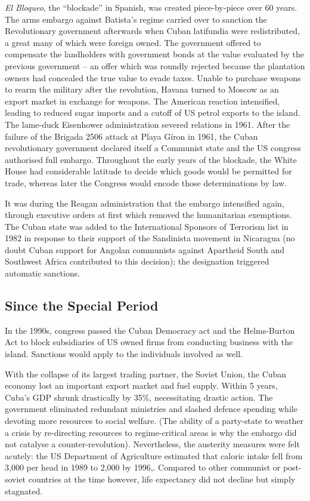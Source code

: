 \documentclass[letterpaper,12pt,twoside]{article} %
\begin{document}
\begin{multicols}{2}
\textit{El Bloqueo}, the ``blockade'' in Spanish, was created piece-by-piece over 60 years. The arms embargo against Batista's regime carried over to sanction the Revolutionary government afterwards when Cuban latifundia were redistributed, a great many of which were foreign owned. The government offered to compensate the landholders with government bonds at the value evaluated by the previous government \autocite[Chapter 7.]{von2011red} -- an offer which was roundly rejected because the plantation owners had concealed the true value to evade taxes. Unable to purchase weapons to rearm the military after the revolution, Havana turned to Moscow as an export market in exchange for weapons. The American reaction intensified, leading to reduced sugar imports and a cutoff of US petrol exports to the island. The lame-duck Eisenhower administration severed relations in 1961. After the failure of the Brigada 2506 attack at Playa Gíron in 1961, the Cuban revolutionary government declared itself a Communist state and the US congress authorised full embargo. Throughout the early years of the blockade, the White House had considerable latitude to decide which goods would be permitted for trade, whereas later the Congress would encode those determinations by law.

It was during the Reagan administration that the embargo intensified again, through executive orders at first which removed the humanitarian exemptions. The Cuban state was added to the International Sponsors of Terrorism list in 1982 in response to their support of the Sandinista movement in Nicaragua (no doubt Cuban support for Angolan communists against Apartheid South and Southwest Africa contributed to this decision); the designation triggered automatic sanctions.

\subsection*{Since the Special Period}

In the 1990s, congress passed the Cuban Democracy act and the Helms-Burton Act to block subsidiaries of US owned firms from conducting business with the island. Sanctions would apply to the individuals involved as well.

With the collapse of its largest trading partner, the Soviet Union, the Cuban economy lost an important export market and fuel supply. Within 5 years, Cuba's GDP shrunk drastically by 35\%\autocite[155]{perez2009cuban}, necessitating drastic action. The government eliminated redundant ministries and slashed defence spending while devoting more resources to social welfare. (The ability of a party-state to weather a crisis by re-directing resources to regime-critical areas is why the embargo did not catalyse a counter-revolution). Nevertheless, the austerity measures were felt acutely: the US Department of Agriculture estimated that caloric intake fell from 3,000 per head in 1989 to 2,000 by 1996,\autocite[16]{usagro}. Compared to other communist or post-soviet countries at the time however, life expectancy did not decline but simply stagnated.


\end{multicols}
\end{document}
